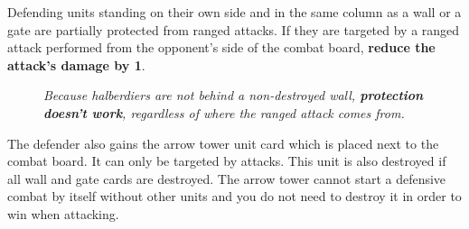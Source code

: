Defending units standing on their own side and in the same column as a wall or a gate are partially protected from ranged attacks.
If they are targeted by a ranged attack performed from the opponent's side of the combat board, \textbf{reduce the attack's damage by 1}.
\begin{figure}[h]
  \begin{minipage}[t]{0.4\textwidth}
    \centering
  \caption[halberdiers protected]{\textit{Halberdiers are behind a non-destroyed gate, they \textbf{are protected} when attacked from spaces 1-8.}}
  \end{minipage}\hfill
  \begin{minipage}[t]{0.4\textwidth}
    \centering
  \caption[halberdiers unprotected]{\textit{Because halberdiers are not behind a non-destroyed wall, \textbf{protection doesn't work}, regardless of where the ranged attack comes from.}}
  \end{minipage}
\end{figure}

The defender also gains the arrow tower unit card which is placed next to the combat board.
It can only be targeted by  attacks.
This unit is also destroyed if all wall and gate cards are destroyed.
The arrow tower cannot start a defensive combat by itself without other units and you do not need to destroy it in order to win when attacking.

\clearpage

